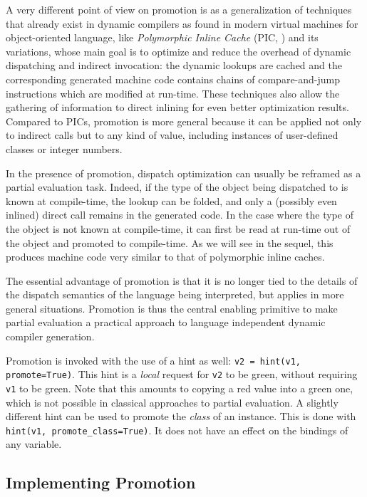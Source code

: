 A very different point of view on promotion is as a generalization of
techniques that already exist in dynamic compilers as found in modern virtual
machines for object-oriented language, like \emph{Polymorphic Inline Cache}
(PIC, \cite{hoelzle_optimizing_1991}) and its variations, whose main goal is
to optimize and reduce the overhead of dynamic dispatching and indirect
invocation: the dynamic lookups are cached and the corresponding generated
machine code contains chains of compare-and-jump instructions which are
modified at run-time.  These techniques also allow the gathering of
information to direct inlining for even better optimization results. Compared
to PICs, promotion is more general because it can be applied not only to
indirect calls but to any kind of value, including instances of user-defined
classes or integer numbers.

In the presence of promotion, dispatch optimization can usually be
reframed as a partial evaluation task.  Indeed, if the type of the
object being dispatched to is known at compile-time, the lookup can be
folded, and only a (possibly even inlined) direct call remains in the
generated code.  In the case where the type of the object is not known
at compile-time, it can first be read at run-time out of the object and
promoted to compile-time.  As we will see in the sequel, this produces
machine code very similar to that of polymorphic inline
caches.

The essential advantage of promotion is that it is no longer tied to the details of
the dispatch semantics of the language being interpreted, but applies in
more general situations.  Promotion is thus the central enabling
primitive to make partial evaluation a practical approach to language
independent dynamic compiler generation.

Promotion is invoked with the use of a hint as well:
\lstinline{v2 = hint(v1, promote=True)}.
This hint is a \emph{local} request for \texttt{v2} to be green, without
requiring \texttt{v1} to be green.  Note that this amounts to copying
a red value into a green one, which is not possible in classical
approaches to partial evaluation. A slightly different hint can be used to
promote the \emph{class} of an instance. This is done with
\lstinline{hint(v1, promote_class=True)}. It does not have an effect on the
bindings of any variable.


\subsection{Implementing Promotion}
\label{sec:implementing-promotion}

